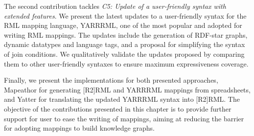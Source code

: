 The second contribution tackles \textit{C5: Update of a user-friendly syntax with extended features}. 
We present the latest updates to a user-friendly syntax for the RML mapping language, YARRRML, one of the most popular and adopted for writing RML mappings. 
The updates include the generation of RDF-star graphs, dynamic datatypes and language tags, and a proposal for simplifying the syntax of join conditions.
We qualitatively validate the updates proposed by comparing them to other user-friendly syntaxes to ensure maximum expressiveness coverage. 

Finally, we present the implementations for both presented approaches, Mapeathor for generating [R2]RML and YARRRML mappings from spreadsheets, and Yatter for translating the updated YARRRML syntax into [R2]RML. The objective of the contributions presented in this chapter is to provide further support for user to ease the writing of mappings, aiming at reducing the barrier for adopting mappings to build knowledge graphs. 


